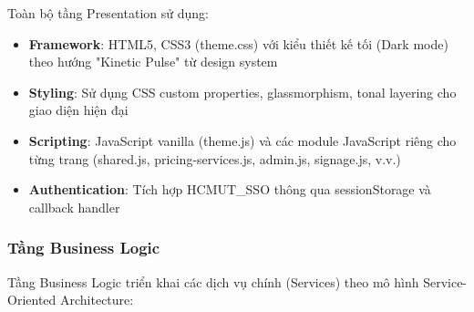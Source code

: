 Toàn bộ tầng Presentation sử dụng:
\begin{itemize}
    \item \textbf{Framework}: HTML5, CSS3 (theme.css) với kiểu thiết kế tối (Dark mode) theo hướng "Kinetic Pulse" từ design system
    \item \textbf{Styling}: Sử dụng CSS custom properties, glassmorphism, tonal layering cho giao diện hiện đại
    \item \textbf{Scripting}: JavaScript vanilla (theme.js) và các module JavaScript riêng cho từng trang (shared.js, pricing-services.js, admin.js, signage.js, v.v.)
    \item \textbf{Authentication}: Tích hợp HCMUT\_SSO thông qua sessionStorage và callback handler
\end{itemize}

\subsubsection{Tầng Business Logic}

Tầng Business Logic triển khai các dịch vụ chính (Services) theo mô hình Service-Oriented Architecture:

